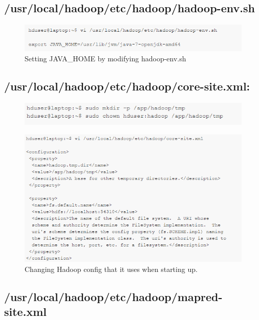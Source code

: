 \documentclass[12pt, letterpaper]{article}
\begin{document}
\subsection{/usr/local/hadoop/etc/hadoop/hadoop-env.sh}

\begin{figure}[H]
\centering
\includegraphics[width=12cm]{RH10}
\caption{Setting JAVA\_HOME by modifying hadoop-env.sh}
\label{fig:ij}
\end{figure}


\subsection{/usr/local/hadoop/etc/hadoop/core-site.xml:}

\begin{figure}[H]
\centering
\includegraphics[width=12cm]{RH11}
\label{fig:ij}
\end{figure}

\begin{figure}[H]
\centering
\includegraphics[width=12cm]{RH12}
\caption{Changing Hadoop config that it uses when starting up.}
\label{fig:ij}
\end{figure}

\subsection{/usr/local/hadoop/etc/hadoop/mapred-site.xml}
\end{document}
